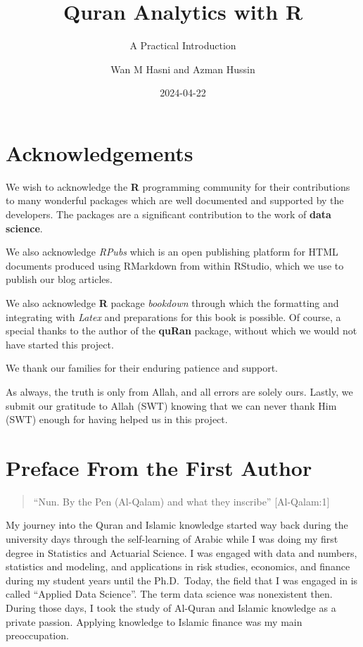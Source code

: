 \documentclass[
]{article}
\title{Quran Analytics with R}
\subtitle{A Practical Introduction}
\author{Wan M Hasni and Azman Hussin}
\date{2024-04-22}
\begin{document}
\maketitle

{
\setcounter{tocdepth}{2}
\tableofcontents
}
\hypertarget{acknowledgements}{%
\section*{Acknowledgements}\label{acknowledgements}}

We wish to acknowledge the \textbf{R} programming community for their contributions to many wonderful packages which are well documented and supported by the developers. The packages are a significant contribution to the work of \textbf{data science}.

We also acknowledge \emph{RPubs} which is an open publishing platform for HTML documents produced using RMarkdown from within RStudio, which we use to publish our blog articles.

We also acknowledge \textbf{R} package \emph{bookdown} through which the formatting and integrating with \emph{Latex} and preparations for this book is possible. Of course, a special thanks to the author of the \textbf{quRan} package, without which we would not have started this project.

We thank our families for their enduring patience and support.

As always, the truth is only from Allah, and all errors are solely ours. Lastly, we submit our gratitude to Allah (SWT) knowing that we can never thank Him (SWT) enough for having helped us in this project.

\hypertarget{preface-from-the-first-author}{%
\section*{Preface From the First Author}\label{preface-from-the-first-author}}

\begin{quote}
``Nun. By the Pen (Al-Qalam) and what they inscribe'' {[}Al-Qalam:1{]}
\end{quote}

My journey into the Quran and Islamic knowledge started way back during the university days through the self-learning of Arabic while I was doing my first degree in Statistics and Actuarial Science. I was engaged with data and numbers, statistics and modeling, and applications in risk studies, economics, and finance during my student years until the Ph.D.~Today, the field that I was engaged in is called ``Applied Data Science''. The term data science was nonexistent then. During those days, I took the study of Al-Quran and Islamic knowledge as a private passion. Applying knowledge to Islamic finance was my main preoccupation.
\end{document}
